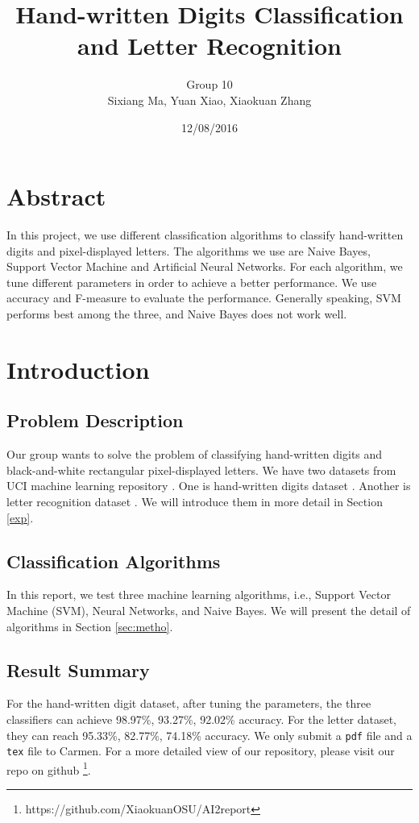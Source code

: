 \documentclass[11pt]{article}
\title{Hand-written Digits Classification and Letter Recognition}
\author{Group 10 \\ Sixiang Ma, Yuan Xiao, Xiaokuan Zhang}
\date{12/08/2016}
\begin{document}
\maketitle
\section*{Abstract}
In this project, we use different classification algorithms to classify hand-written digits and pixel-displayed letters. The algorithms we use are Naive Bayes, Support Vector Machine and Artificial Neural Networks. For each algorithm, we tune different parameters in order to achieve a better performance. We use accuracy and F-measure to evaluate the performance. Generally speaking, SVM performs best among the three, and Naive Bayes does not work well. 


\section{Introduction}

\subsection{Problem Description}
Our group wants to solve the problem of classifying hand-written digits and  black-and-white rectangular pixel-displayed letters. We have two datasets from UCI machine learning repository \cite{Lichman2013}. One is hand-written digits dataset \cite{digitdataset}. Another is letter recognition dataset \cite{letterdataset}. We will introduce them in more detail in Section \ref{exp}.

\subsection{Classification Algorithms}
In this report, we test three machine learning  algorithms, i.e., Support Vector Machine (SVM), Neural Networks, and Naive Bayes. We will present the detail of algorithms in Section \ref{sec:metho}.
\subsection{Result Summary}
For the hand-written digit dataset, after tuning the parameters, the three classifiers can achieve 98.97\%, 93.27\%, 92.02\%  accuracy. For the letter dataset, they can reach 95.33\%, 82.77\%, 74.18\% accuracy. We only submit a \texttt{pdf} file and a \texttt{tex} file to Carmen. For a more detailed view of our repository, please visit our repo on github \footnote{https://github.com/XiaokuanOSU/AI2report}.
\end{document}
